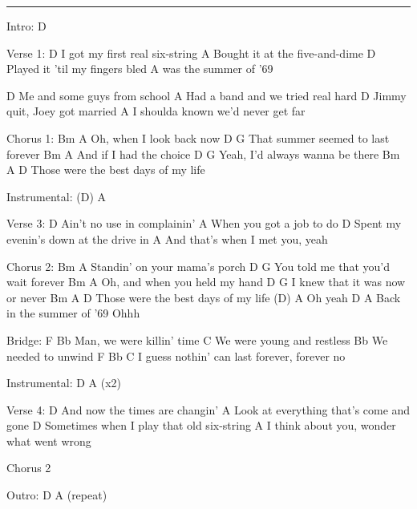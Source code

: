 \noindent\rule{\columnwidth}{1pt}
\begin{multicols}{2}
\begin{lstsong}
Intro: D

Verse 1:
D
   I got my first real six-string
A
   Bought it at the five-and-dime
D
   Played it 'til my fingers bled
A
   was the summer of '69

D
   Me and some guys from school
A
   Had a band and we tried real hard
D
   Jimmy quit, Joey got married
A
   I shoulda known we'd never get far

Chorus 1:
Bm             A
    Oh, when I look back now
D                         G
    That summer seemed to last forever
Bm           A
    And if I had the choice
D                    G
    Yeah, I'd always wanna be there
Bm                 A               D
    Those were the best days of my life

Instrumental: (D)   A

Verse 3:
D
    Ain't no use in complainin'
A
    When you got a job to do
D
    Spent my evenin's down at the drive in
A
    And that's when I met you, yeah
\end{lstsong}\vfill\columnbreak\begin{lstsong}
Chorus 2:
Bm                   A
    Standin' on your mama's porch
D                          G
    You told me that you'd wait forever
Bm                   A
    Oh, and when you held my hand
D                      G
    I knew that it was now or never
Bm                 A               D
    Those were the best days of my life
(D)            A
         Oh yeah
                       D     A
Back in the summer of '69    Ohhh

Bridge:
F               Bb
   Man, we were killin' time
        C
We were young and restless
   Bb
We needed to unwind
F          Bb                  C
   I guess nothin' can last forever, forever no

Instrumental: D    A  (x2)

Verse 4:
D
   And now the times are changin'
A
   Look at everything that's come and gone
D
   Sometimes when I play that old six-string
A
   I think about you, wonder what went wrong

Chorus 2

Outro: D  A  (repeat)
\end{lstsong}
\end{multicols}
\newpage
